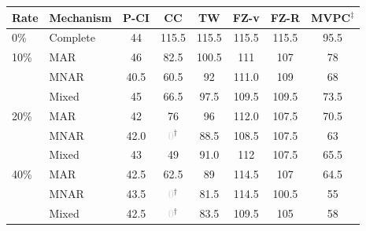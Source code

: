 \begin{tabular}{llcccccc}
    \toprule
    Rate & Mechanism & P-CI & CC & TW & FZ-v & FZ-R & MVPC$^\ddagger$ \\
    \midrule
    0\% & Complete & 44 & 115.5 & 115.5 & 115.5 & 115.5 & 95.5 \\
    \midrule
    10\% & MAR   & 46 & 82.5 & 100.5 & 111 & 107 & 78 \\
         & MNAR  & 40.5 & 60.5 & 92 & 111.0 & 109 & 68 \\
         & Mixed & 45 & 66.5 & 97.5 & 109.5 & 109.5 & 73.5 \\
    \midrule
    20\% & MAR   & 42 & 76 & 96 & 112.0 & 107.5 & 70.5 \\
         & MNAR  & 42.0 & \textcolor{lightgray}{0}$^\dagger$ & 88.5 & 108.5 & 107.5 & 63 \\
         & Mixed & 43 & 49 & 91.0 & 112 & 107.5 & 65.5 \\
    \midrule
    40\% & MAR   & 42.5 & 62.5 & 89 & 114.5 & 107 & 64.5 \\
         & MNAR  & 43.5 & \textcolor{lightgray}{0}$^\dagger$ & 81.5 & 114.5 & 100.5 & 55 \\
         & Mixed & 42.5 & \textcolor{lightgray}{0}$^\dagger$ & 83.5 & 109.5 & 105 & 58 \\
    \bottomrule
\end{tabular}
